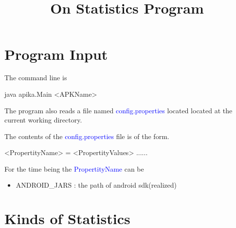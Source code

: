 \documentclass{article}
\title{On Statistics Program}
\begin{document}
\tableofcontents
\section{Program Input}
The command line is
\begin{verbatime}
java apika.Main <APKName>
\end{verbatime}
The program also reads a file named 
\textcolor{blue}{config.properties} located 
located at the current working directory. 
\par{
The contents of the \textcolor{blue}{config.properties} 
file is of the form.
\begin{verbatime}
<PropertityName> = <PropertityValues>
......
\end{verbatime}
For the time being the \textcolor{blue}{PropertityName} can be
\begin{itemize}
	\item ANDROID_JARS : the path of android sdk(realized)
\end{itemize}
}

\section{Kinds of Statistics}
\end{document}
